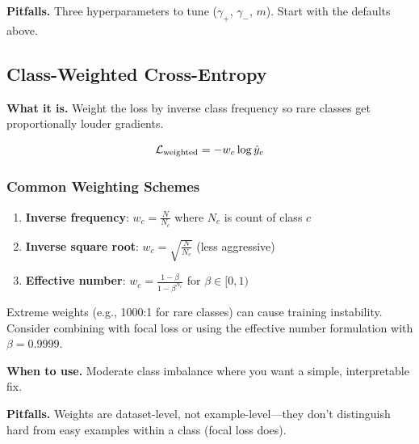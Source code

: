 \textbf{Pitfalls.} Three hyperparameters to tune ($\gamma_+$, $\gamma_-$, $m$). Start with the defaults above.

\subsection{Class-Weighted Cross-Entropy}

\textbf{What it is.} Weight the loss by inverse class frequency so rare classes get proportionally louder gradients.

\begin{equation}
\mathcal{L}_{\text{weighted}} = -w_c \log\hat{y}_c
\end{equation}

\subsubsection{Common Weighting Schemes}

\begin{enumerate}
    \item \textbf{Inverse frequency}: $w_c = \frac{N}{N_c}$ where $N_c$ is count of class $c$

    \item \textbf{Inverse square root}: $w_c = \sqrt{\frac{N}{N_c}}$ (less aggressive)

    \item \textbf{Effective number}: $w_c = \frac{1-\beta}{1-\beta^{N_c}}$ for $\beta \in [0,1)$
\end{enumerate}

\begin{warningbox}
Extreme weights (e.g., 1000:1 for rare classes) can cause training instability. Consider combining with focal loss or using the effective number formulation with $\beta = 0.9999$.
\end{warningbox}

\textbf{When to use.} Moderate class imbalance where you want a simple, interpretable fix.

\textbf{Pitfalls.} Weights are dataset-level, not example-level---they don't distinguish hard from easy examples within a class (focal loss does).

